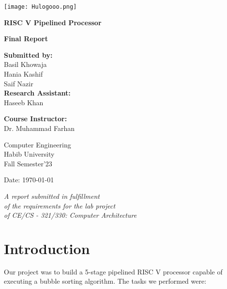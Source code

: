 \documentclass[12pt]{article}
\begin{document}
\begin{titlepage}
    \begin{center}
        \texttt{[image: Hulogooo.png]} 
        \vspace{1cm}

        \LARGE
        \textbf{RISC V Pipelined Processor}

        \vspace{1.5cm}
        \Large
        \textbf{Final Report}

        \vspace{2cm}
        \large
        \textbf{Submitted by:}\\
        Basil Khowaja \\
        Hania Kashif \\
        Saif Nazir\\

        \vspace{0.5cm}
        \large
        \textbf{Research Assistant:}\\
        Haseeb Khan

        \vspace{0.5cm}
        \large
       \textbf{ Course Instructor:}\\
       Dr. Muhammad Farhan

        \vspace{1cm}
        \large
        Computer Engineering\\ Habib University\\
        Fall Semester'23

        \vspace{1cm}
        \large
        Date: \today 

        \vfill
        \small
        \textit{A report submitted in fulfillment\\
        of the requirements for the lab project\\ of 
        CE/CS - 321/330: Computer Architecture}

    \end{center}
\end{titlepage}
\tableofcontents

\newpage



\section{Introduction}\label{sec:intro}
Our project was to build a 5-stage pipelined RISC V processor capable of executing a bubble sorting algorithm. The tasks we performed were:
\end{document}

